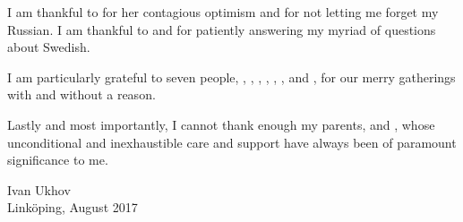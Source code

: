 I am thankful to  for her contagious optimism and
for not letting me forget my Russian. I am thankful to 
and  for patiently answering my myriad of questions about
Swedish.

I am particularly grateful to seven people, ,
, , ,
, , and
, for our merry gatherings with and without a
reason.

Lastly and most importantly, I cannot thank enough my parents,
 and , whose unconditional and
inexhaustible care and support have always been of paramount significance to me.

\vspace{4em}
\hfill
\begin{minipage}{0.35\textwidth}
Ivan Ukhov\\
Linköping, August 2017
\end{minipage}
